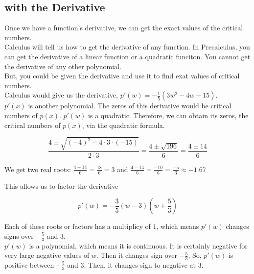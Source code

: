 \documentclass{ximera}
\begin{document}
\subsection*{with the Derivative}


Once we have a function's derivative, we can get the exact values of the critical numbers. \\


Calculus will tell us how to get the derivative of any function.  In Precalculus, you can get the derivative of a linear function or a quadratic funciton.  You cannot get the derivative of any other polynomial.\\

But, you could be given the derivative and use it to find exat values of critical numbers. \\




Calculus would give us the derivative, $p'(w) = -\frac{1}{5}(3w^2 - 4w - 15)$. \\

$p'(x)$ is another polynomial. The zeros of this derivative would be critical numbers of $p(x)$.  $p'(w)$ is a quadratic.  Therefore, we can obtain its zeros, the critical numbers of $p(x)$, via the quadratic formula.


\[  \frac{4 \pm \sqrt{(-4)^2 - 4 \cdot 3 \cdot (-15)}}{2 \cdot 3} =    \frac{4 \pm \sqrt{196}}{6}  = \frac{4 \pm 14}{6}       \]

We get two real roots: $\frac{4 + 14}{6} = \frac{18}{6} = 3$  and $\frac{4 - 14}{6} = \frac{-10}{6} = \frac{-5}{3} \approx -1.67$




This allows us to factor the derivative

\[
p'(w) = -\frac{3}{5}(w - 3) \left( w + \frac{5}{3} \right)
\]

Each of these roots or factors has a multiplicy of $1$, which means $p'(w)$ changes signs over $-\frac{5}{3}$ and $3$. \\


$p'(w)$ is a polynomial, which means it is continuous. It is certainly negative for very large negative values of $w$.  Then it changes sign over $-\frac{5}{3}$.  So, $p'(w)$ is positive between $-\frac{5}{3}$ and $3$.  Then, it changes sign to negative at $3$.
\end{document}
